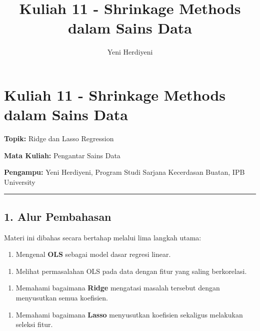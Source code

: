 \documentclass[12pt,a4paper]{article}
\begin{document}
\title{Kuliah 11 - Shrinkage Methods dalam Sains Data}
\author{Yeni Herdiyeni}
\date{}
\maketitle

\maketitle
\tableofcontents
\newpage

\section{Kuliah 11 - Shrinkage Methods dalam Sains Data}

\textbf{Topik:} Ridge dan Lasso Regression  

\textbf{Mata Kuliah:} Pengantar Sains Data  

\textbf{Pengampu:} Yeni Herdiyeni, Program Studi Sarjana Kecerdasan Buatan, IPB University


\hrule


\subsection{1. Alur Pembahasan}

Materi ini dibahas secara bertahap melalui lima langkah utama:


\begin{enumerate}
\item Mengenal \textbf{OLS} sebagai model dasar regresi linear.
\end{enumerate}

\begin{enumerate}
\item Melihat permasalahan OLS pada data dengan fitur yang saling berkorelasi.
\end{enumerate}

\begin{enumerate}
\item Memahami bagaimana \textbf{Ridge} mengatasi masalah tersebut dengan menyusutkan semua koefisien.
\end{enumerate}

\begin{enumerate}
\item Memahami bagaimana \textbf{Lasso} menyusutkan koefisien sekaligus melakukan seleksi fitur.
\end{enumerate}
\end{document}
